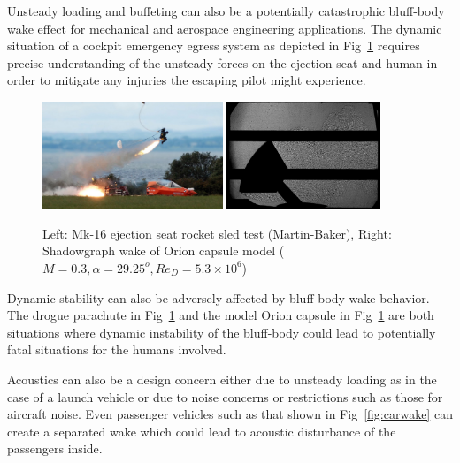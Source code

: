 \documentclass[journal]{new-aiaa}
\begin{document}
Unsteady loading and buffeting can also be a potentially catastrophic bluff-body wake effect for mechanical and aerospace engineering applications.  The dynamic situation of a cockpit emergency egress system as depicted in Fig~\ref{fig:orionwakeandejectionseat} requires precise understanding of the unsteady forces on the ejection seat and human in order to mitigate any injuries the escaping pilot might experience.

\begin{figure}[htb]
\begin{center}
\includegraphics[width=0.48\textwidth]{Images/logan/martinbaker_EjectionSeat.jpg}
\includegraphics[width=0.41\textwidth]{Images/logan/ross2013comprehensive_CapsuleWakeShadowgraph.pdf}
\caption{ Left: Mk-16 ejection seat rocket sled test (Martin-Baker), Right: Shadowgraph wake of Orion capsule model ($M=0.3, \alpha=29.25^o, Re_D = 5.3\times10^6$) \cite{ross2013comprehensive}}
\label{fig:orionwakeandejectionseat}
\end{center}
\end{figure}

Dynamic stability can also be adversely affected by bluff-body wake behavior.  The drogue parachute in Fig~\ref{fig:orionwakeandejectionseat} and the model Orion capsule in Fig~\ref{fig:orionwakeandejectionseat} are both situations where dynamic instability of the bluff-body could lead to potentially fatal situations for the humans involved.

Acoustics can also be a design concern either due to unsteady loading as in the case of a launch vehicle or due to noise concerns or restrictions such as those for aircraft noise. Even passenger vehicles such as that shown in Fig~\ref{fig:carwake} can create a separated wake which could lead to acoustic disturbance of the passengers inside.
\end{document}
